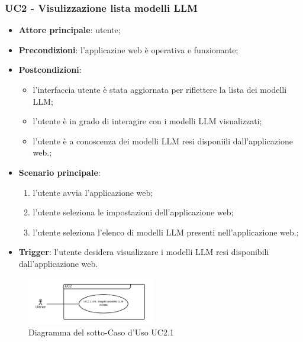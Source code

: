 \documentclass[10pt, a4paper]{article}
\begin{document}
    \subsubsection{UC2 - Visulizzazione lista modelli LLM}
    \begin{itemize}
        \item \textbf{Attore principale}: utente;
        \item \textbf{Precondizioni}: l'applicazine web è operativa e funzionante;
        \item \textbf{Postcondizioni}: 
        \begin{itemize}
            \item l'interfaccia utente è stata aggiornata per riflettere la lista dei modelli LLM;
            \item l'utente è in grado di interagire con i modelli LLM visualizzati;
            \item l'utente è a conoscenza dei modelli LLM resi disponiili dall'applicazione web.;
        \end{itemize}
        \item \textbf{Scenario principale}:
            \begin{enumerate}
                \item l'utente avvia l'applicazione web;
                \item l'utente seleziona le impostazioni dell'applicazione web;
                \item l'utente seleziona l'elenco di modelli LLM presenti nell'applicazione web.;
            \end{enumerate}
        \item \textbf{Trigger}: l'utente desidera visualizzare i modelli LLM resi disponibili dall'applicazione web.
    \end{itemize}
    
    \begin{figure}[h]
        \centering
        \includegraphics[width=0.5\textwidth, height=0.5\textheight, keepaspectratio]{UC-images/UC2.1.png}
        \caption{Diagramma del sotto-Caso d'Uso UC2.1}
    \end{figure}
\end{document}
